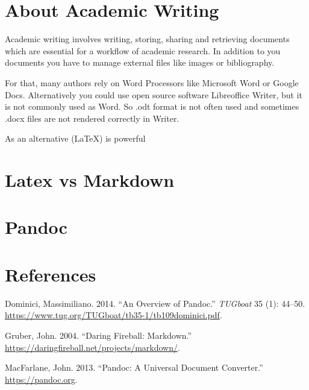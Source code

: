 \hypertarget{about-academic-writing}{%
\section{About Academic Writing}\label{about-academic-writing}}

Academic writing involves writing, storing, sharing and retrieving
documents which are essential for a workflow of academic research. In
addition to you documents you have to manage external files like images
or bibliography.

For that, many authors rely on Word Processors like Microsoft Word or
Google Docs. Alternatively you could use open source software
Libreoffice Writer, but it is not commonly used as Word. So .odt format
is not often used and sometimes .docx files are not rendered correctly
in Writer.

As an alternative (\LaTeX) is powerful

\hypertarget{latex-vs-markdown}{%
\section{Latex vs Markdown}\label{latex-vs-markdown}}

\hypertarget{pandoc}{%
\section{Pandoc}\label{pandoc}}

\hypertarget{references}{%
\section{References}\label{references}}

\hypertarget{refs}{}
\leavevmode\hypertarget{ref-dominici2014overview}{}%
Dominici, Massimiliano. 2014. ``An Overview of Pandoc.'' \emph{TUGboat}
35 (1): 44--50.
\url{https://www.tug.org/TUGboat/tb35-1/tb109dominici.pdf}.

\leavevmode\hypertarget{ref-gruber2004markdown}{}%
Gruber, John. 2004. ``Daring Fireball: Markdown.''
\url{https://daringfireball.net/projects/markdown/}.

\leavevmode\hypertarget{ref-macfarlane2013pandoc}{}%
MacFarlane, John. 2013. ``Pandoc: A Universal Document Converter.''
\url{https://pandoc.org}.
